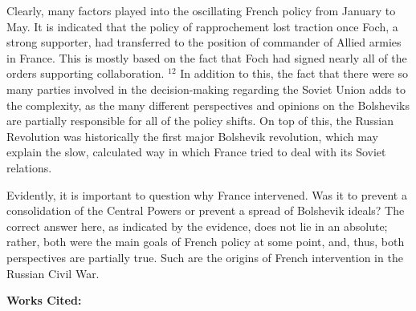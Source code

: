 \begin{justify}
  \hspace{.5 in} Clearly, many factors played into the oscillating French policy from January to May. It is indicated that the policy of rapprochement lost traction once Foch, a strong supporter, had transferred to the position of commander of Allied armies in France. This is mostly based on the fact that Foch had signed nearly all of the orders supporting collaboration. $^{12}$ In addition to this, the fact that there were so many parties involved in the decision-making regarding the Soviet Union adds to the complexity, as the many different perspectives and opinions on the Bolsheviks are partially responsible for all of the policy shifts. On top of this, the Russian Revolution was historically the first major Bolshevik revolution, which may explain the slow, calculated way in which France tried to deal with its Soviet relations. 

  \hspace{.5 in} Evidently, it is important to question why France intervened. Was it to prevent a consolidation of the Central Powers or prevent a spread of Bolshevik ideals? The correct answer here, as indicated by the evidence, does not lie in an absolute; rather, both were the main goals of French policy at some point, and, thus, both perspectives are partially true. Such are the origins of French intervention in the Russian Civil War.

\end{justify}

\newpage

\begin{center}
  
  \textbf{Works Cited:}

\end{center}

\singlespacing

\begin{justify} 


\end{justify}

